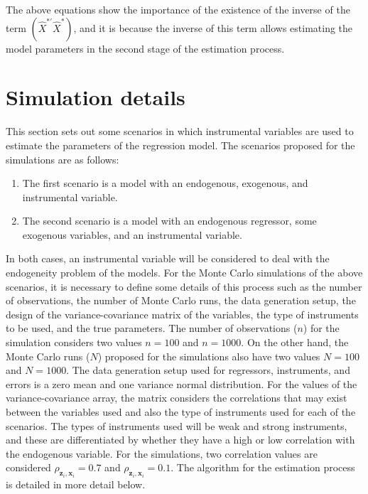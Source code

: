 \documentclass{article}
\begin{document}
The above equations show the importance of the existence of the inverse of the term $(\hat{X}^{*'} \hat{X}^{*})$, and it is because the inverse of this term allows estimating the model parameters in the second stage of the estimation process.


\section{Simulation details}
This section sets out some scenarios in which instrumental variables are used to estimate the parameters of the regression model. The scenarios proposed for the simulations are as follows:
\begin{enumerate}
    \item The first scenario is a model with an endogenous, exogenous, and instrumental variable.
    \item The second scenario is a model with an endogenous regressor, some exogenous variables, and an instrumental variable.
\end{enumerate}
In both cases, an instrumental variable will be considered to deal with the endogeneity problem of the models.
For the Monte Carlo simulations of the above scenarios, it is necessary to define some details of this process such as the number of observations, the number of Monte Carlo runs, the data generation setup, the design of the variance-covariance matrix of the variables, the type of instruments to be used, and the true parameters. 
The number of observations ($n$) for the simulation considers two values $n = 100$ and $n = 1000$. On the other hand, the Monte Carlo runs ($N$) proposed for the simulations also have two values $N = 100$ and $N = 1000$. The data generation setup used for regressors, instruments, and errors is a zero mean and one variance normal distribution. For the values of the variance-covariance array, the matrix considers the correlations that may exist between the variables used and also the type of instruments used for each of the scenarios.
The types of instruments used will be weak and strong instruments, and these are differentiated by whether they have a high or low correlation with the endogenous variable. For the simulations, two correlation values are considered $\rho_{\textbf{z}_{i},\textbf{x}_{i}} = 0.7$ and $\rho_{\textbf{z}_{i},\textbf{x}_{i}} = 0.1$. The algorithm for the estimation process is detailed in more detail below.
\end{document}
